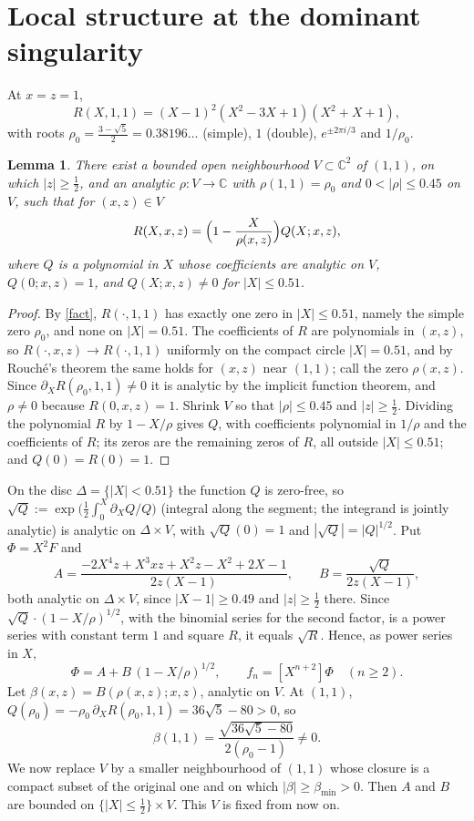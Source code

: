 \documentclass[11pt]{amsart}
\newtheorem{lemma}[theorem]{Lemma}
\theoremstyle{remark}
\newcommand{\C}{\mathbb{C}}
\begin{document}
\section{Local structure at the dominant singularity}
At $x=z=1$,
\begin{equation}\label{fact}
R(X,1,1)=(X-1)^2(X^2-3X+1)(X^2+X+1),
\end{equation}
with roots $\rho_0=\frac{3-\sqrt5}{2}=0.38196\ldots$ (simple), $1$ (double), $e^{\pm2\pi i/3}$ and $1/\rho_0$.

\begin{lemma}\label{local}
There exist a bounded open neighbourhood $V\subset\C^2$ of $(1,1)$, on which $|z|\ge\frac12$, and an analytic
$\rho:V\to\C$ with $\rho(1,1)=\rho_0$ and $0<|\rho|\le 0.45$ on $V$, such that for $(x,z)\in V$
\[
R(X,x,z)=\Bigl(1-\frac{X}{\rho(x,z)}\Bigr)Q(X;x,z),
\]
where $Q$ is a polynomial in $X$ whose coefficients are analytic on $V$, $Q(0;x,z)=1$, and $Q(X;x,z)\ne0$ for
$|X|\le 0.51$.
\end{lemma}
\begin{proof}
By \eqref{fact}, $R(\cdot,1,1)$ has exactly one zero in $|X|\le 0.51$, namely the simple zero $\rho_0$, and none
on $|X|=0.51$. The coefficients of $R$ are polynomials in $(x,z)$, so $R(\cdot,x,z)\to R(\cdot,1,1)$ uniformly on
the compact circle $|X|=0.51$, and by Rouch\'e's theorem the same holds for
$(x,z)$ near $(1,1)$; call the zero $\rho(x,z)$. Since $\partial_XR(\rho_0,1,1)\neq0$ it is analytic by the
implicit function theorem, and $\rho\ne0$ because $R(0,x,z)=1$. Shrink $V$ so that $|\rho|\le0.45$ and
$|z|\ge\frac12$. Dividing the polynomial $R$ by $1-X/\rho$ gives $Q$, with coefficients polynomial in $1/\rho$
and the coefficients of $R$; its zeros are the remaining zeros of $R$, all outside $|X|\le0.51$; and
$Q(0)=R(0)=1$.
\end{proof}

On the disc $\Delta=\{|X|<0.51\}$ the function $Q$ is zero-free, so
$\sqrt Q:=\exp\bigl(\tfrac12\int_0^X \partial_XQ/Q\bigr)$ (integral along the segment; the integrand is jointly
analytic) is analytic on $\Delta\times V$, with $\sqrt Q(0)=1$ and $|\sqrt Q|=|Q|^{1/2}$.
Put $\Phi=X^2F$ and
\[
A=\frac{-2X^4z+X^3xz+X^2z-X^2+2X-1}{2z(X-1)},\qquad B=\frac{\sqrt Q}{2z(X-1)},
\]
both analytic on $\Delta\times V$, since $|X-1|\ge0.49$ and $|z|\ge\frac12$ there. Since $\sqrt Q\cdot(1-X/\rho)^{1/2}$, with the binomial series for the
second factor, is a power series with constant term $1$ and square $R$, it equals $\sqrt R$. Hence, as power series
in $X$,
\begin{equation}\label{AB}
\Phi=A+B\,(1-X/\rho)^{1/2},\qquad f_n=[X^{n+2}]\Phi\quad(n\ge2).
\end{equation}
Let $\beta(x,z)=B(\rho(x,z);x,z)$, analytic on $V$. At $(1,1)$, $Q(\rho_0)=-\rho_0\,\partial_XR(\rho_0,1,1)=36\sqrt5-80>0$,
so
\[
\beta(1,1)=\frac{\sqrt{36\sqrt5-80}}{2(\rho_0-1)}\neq0 .
\]
We now replace $V$ by a smaller neighbourhood of $(1,1)$ whose closure is a compact subset of the original one and
on which $|\beta|\ge\beta_{\min}>0$. Then $A$ and $B$ are bounded on $\{|X|\le\frac12\}\times V$. This $V$ is fixed
from now on.
\end{document}
